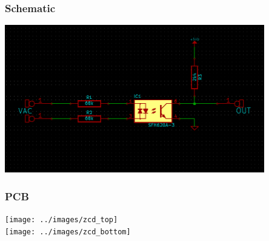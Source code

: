 \subsubsection{Schematic}
\includegraphics[width=0.85\textwidth]{../images/zcd_schematic}~

\subsubsection{PCB}
\texttt{[image: ../images/zcd\_top]}~  \\
\texttt{[image: ../images/zcd\_bottom]}~

